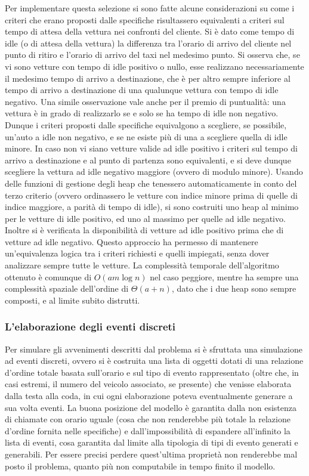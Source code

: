 \documentclass[a4paper,11pt]{Article}
\begin{document}
Per implementare questa selezione si sono fatte alcune considerazioni su come i criteri che erano proposti dalle specifiche risultassero equivalenti a criteri sul tempo di attesa della vettura nei confronti del cliente.
Si è dato come tempo di idle (o di attesa della vettura) la differenza tra l'orario di arrivo del cliente nel punto di ritiro e l'orario di arrivo del taxi nel medesimo punto.
Si osserva che, se vi sono vetture con tempo di idle positivo o nullo, esse realizzano necessariamente il medesimo tempo di arrivo a destinazione, che è per altro sempre inferiore al tempo di arrivo a destinazione di una qualunque vettura con tempo di idle negativo. Una simile osservazione vale anche per il premio di puntualità: una vettura è in grado di realizzarlo se e solo se ha tempo di idle non negativo.
Dunque i criteri proposti dalle specifiche equivalgono a scegliere, se possibile, un'auto a idle non negativo, e se ne esiste più di una a scegliere quella di idle minore. In caso non vi siano vetture valide ad idle positivo i criteri sul tempo di arrivo a destinazione e al punto di partenza sono equivalenti, e si deve dunque scegliere la vettura ad idle negativo maggiore (ovvero di modulo minore).
Usando delle funzioni di gestione degli heap che tenessero automaticamente in conto del terzo criterio (ovvero ordinassero le vetture con indice minore prima di quelle di indice maggiore, a parità di tempo di idle), si sono costruiti uno heap al minimo per le vetture di idle positivo, ed uno al massimo per quelle ad idle negativo.
Inoltre si è verificata la disponibilità di vetture ad idle positivo prima che di vetture ad idle negativo. Questo approccio ha permesso di mantenere un'equivalenza logica tra i criteri richiesti e quelli impiegati, senza dover analizzare sempre tutte le vetture. La complessità temporale dell'algoritmo ottenuto è comunque di $O(am\log{n})$ nel caso peggiore, mentre ha sempre una complessità spaziale dell'ordine di $\Theta(a + n)$, dato che i due heap sono sempre composti, e al limite subito distrutti.

\subsubsection{L'elaborazione degli eventi discreti}
Per simulare gli avvenimenti descritti dal problema si è sfruttata una simulazione ad eventi discreti, ovvero si è costruita una lista di oggetti dotati di una relazione d'ordine totale basata sull'orario e sul tipo di evento rappresentato (oltre che, in casi estremi, il numero del veicolo associato, se presente) che venisse elaborata dalla testa alla coda, in cui ogni elaborazione poteva eventualmente generare a sua volta eventi.
La buona posizione del modello è garantita dalla non esistenza di chiamate con orario uguale (cosa che non renderebbe più totale la relazione d'ordine fornita nelle specifiche) e dall'impossibilità di espandere all'infinito la lista di eventi, cosa garantita dal limite alla tipologia di tipi di evento generati e generabili. Per essere precisi perdere quest'ultima proprietà non renderebbe mal posto il problema, quanto più non computabile in tempo finito il modello.
\end{document}
